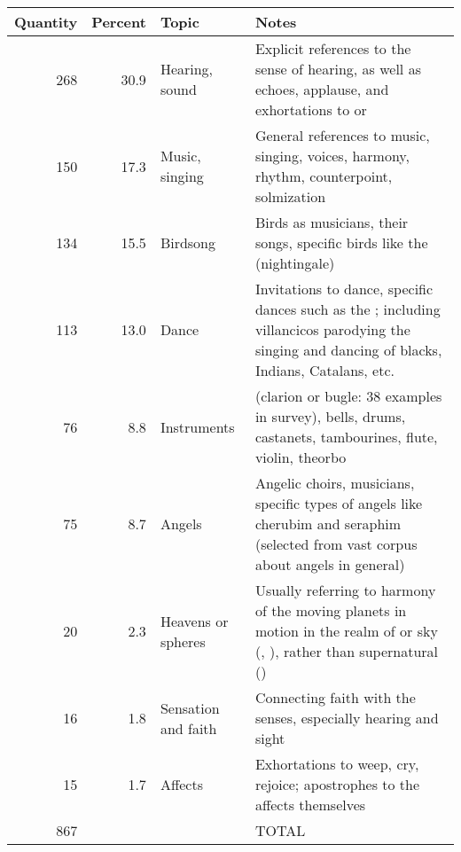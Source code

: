 \begin{tabulary}{\textwidth}{rrlL}
    \toprule
    Quantity
    & Percent 
    & Topic  
    & Notes \\
    \midrule

    268 
    & 30.9 
    & Hearing, sound   
    & Explicit references to the sense of hearing, as well as echoes, applause,
    and exhortations to   or  \\
    \addlinespace
    
    150 
    & 17.3 
    & Music, singing  
    & General references to music, singing, voices, harmony, rhythm,
    counterpoint, solmization \\
    \addlinespace
    
    134 
    & 15.5 
    & Birdsong    
    & Birds as musicians, their songs, specific birds like the 
    (nightingale) \\
    \addlinespace

    113 
    & 13.0 
    & Dance     
    & Invitations to dance, specific dances such as the 
    ; including  villancicos parodying the singing
    and dancing of blacks, Indians,  Catalans, etc. \\
    \addlinespace
    
    76 
    & 8.8 
    & Instruments   
    &  (clarion or bugle: 38 examples in survey), 
    bells, drums, castanets, tambourines, flute, violin, theorbo \\
    \addlinespace
    
    75 
    & 8.7 
    & Angels    
    & Angelic choirs, musicians, specific types of angels like cherubim and
    seraphim (selected from vast corpus about angels in general) \\
    \addlinespace
    
    20 
    & 2.3 
    & Heavens or spheres 
    & Usually referring to harmony of the moving planets in motion in the
    realm of  or sky (, ), rather
    than supernatural  () \\
    \addlinespace
    
    16 
    & 1.8 
    & Sensation and faith 
    & Connecting faith with the senses, especially hearing and sight \\
    \addlinespace
    
    15 
    & 1.7 
    & Affects    
    & Exhortations to weep, cry, rejoice; apostrophes to the affects
    themselves \\
    \midrule
   
    867 
    &  
    &       
    & TOTAL \\
    \bottomrule
\end{tabulary} 
\endinput

